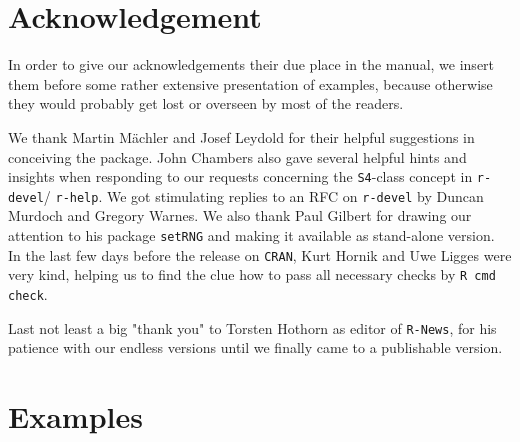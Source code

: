 \documentclass[11pt]{article}
\begin{document}
\section{Acknowledgement}
In order to give our acknowledgements their due place
in the manual, we insert them before some rather
extensive presentation of examples, because otherwise
they would probably get lost or overseen by most of the
readers.

We thank Martin M\"achler and Josef Leydold for their
helpful suggestions in conceiving the package.
John Chambers also gave several helpful hints and
insights when responding to our requests concerning the
{\tt S4}-class concept in {\tt r-devel}/ {\tt r-help}.
We got stimulating replies to an RFC on {\tt r-devel} by
Duncan Murdoch and Gregory Warnes.
We also thank Paul Gilbert for drawing our attention to his package
 {\tt setRNG} and making it available as stand-alone version.
In the last few days before the release on {\tt CRAN}, Kurt Hornik and
Uwe Ligges were very kind, helping us to find the clue how to
pass all necessary checks by {\tt R cmd check}.

Last not least a big "thank you" to Torsten Hothorn as editor
of {\tt R-News}, for his patience with our endless versions
until we finally came to a publishable version.
%
%
\section{Examples}
\end{document}
